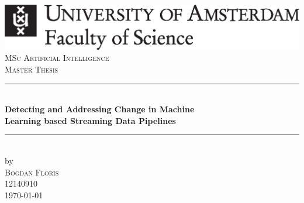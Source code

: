 \documentclass{article}
\begin{document}
\begin{titlepage}

\newcommand{\HRule}{\rule{\linewidth}{0.5mm}} %
\center %
 

\includegraphics[width=\linewidth]{assets/uvaENG.eps}\\[2.5cm]
\textsc{\Large MSc Artificial Intelligence}\\[0.2cm]
\textsc{\Large Master Thesis}\\[0.5cm]


\HRule \\[0.4cm]
{ \huge \bfseries Detecting and Addressing Change in Machine\\ Learning based Streaming Data Pipelines}\\[0.4cm] %
\HRule \\[0.5cm]
 

by\\[0.2cm]
\textsc{\Large Bogdan Floris}\\[0.2cm] %
12140910\\[1cm]



{\Large \today}\\[1cm] %


\end{titlepage}
\end{document}
